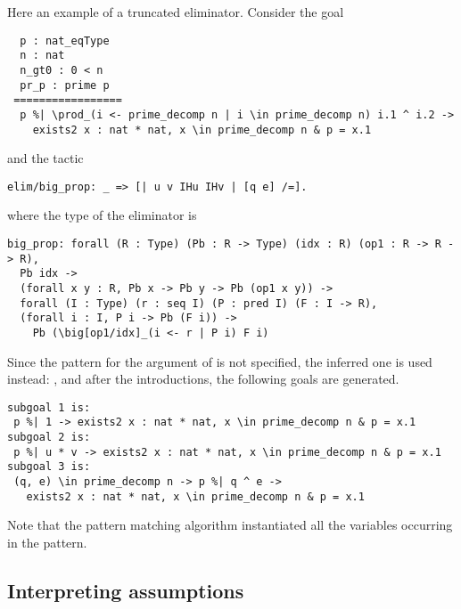 Here an example of a truncated eliminator. Consider the goal
\begin{lstlisting}
  p : nat_eqType
  n : nat
  n_gt0 : 0 < n
  pr_p : prime p
 =================
  p %| \prod_(i <- prime_decomp n | i \in prime_decomp n) i.1 ^ i.2 ->
    exists2 x : nat * nat, x \in prime_decomp n & p = x.1
\end{lstlisting}
and the tactic
\begin{lstlisting}
elim/big_prop: _ => [| u v IHu IHv | [q e] /=].
\end{lstlisting}
where the type of the eliminator is
\begin{lstlisting}
big_prop: forall (R : Type) (Pb : R -> Type) (idx : R) (op1 : R -> R -> R),
  Pb idx ->
  (forall x y : R, Pb x -> Pb y -> Pb (op1 x y)) ->
  forall (I : Type) (r : seq I) (P : pred I) (F : I -> R),
  (forall i : I, P i -> Pb (F i)) ->
    Pb (\big[op1/idx]_(i <- r | P i) F i)
\end{lstlisting}
Since the pattern for the argument of  is not specified, the inferred one
is used instead: , and after the
introductions, the following goals are generated.
\begin{lstlisting}
subgoal 1 is:
 p %| 1 -> exists2 x : nat * nat, x \in prime_decomp n & p = x.1
subgoal 2 is:
 p %| u * v -> exists2 x : nat * nat, x \in prime_decomp n & p = x.1
subgoal 3 is:
 (q, e) \in prime_decomp n -> p %| q ^ e ->
   exists2 x : nat * nat, x \in prime_decomp n & p = x.1
\end{lstlisting}
Note that the pattern matching algorithm instantiated all the variables
occurring in the pattern.

\subsection{Interpreting assumptions}\label{ssec:assumpinterp}


